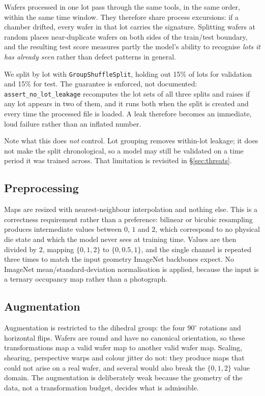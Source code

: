 \documentclass[11pt,a4paper]{article}
\begin{document}
Wafers processed in one lot pass through the same tools, in the same order,
within the same time window. They therefore share process excursions: if a
chamber drifted, every wafer in that lot carries the signature. Splitting
wafers at random places near-duplicate wafers on both sides of the train/test
boundary, and the resulting test score measures partly the model's ability to
recognise \emph{lots it has already seen} rather than defect patterns in
general.

We split by lot with \texttt{GroupShuffleSplit}, holding out 15\% of lots for
validation and 15\% for test. The guarantee is enforced, not documented:
\texttt{assert\_no\_lot\_leakage} recomputes the lot sets of all three splits
and raises if any lot appears in two of them, and it runs both when the split
is created and every time the processed file is loaded. A leak therefore
becomes an immediate, loud failure rather than an inflated number.

Note what this does \emph{not} control. Lot grouping removes within-lot
leakage; it does not make the split chronological, so a model may still be
validated on a time period it was trained across. That limitation is revisited
in \S\ref{sec:threats}.

\subsection{Preprocessing}

Maps are resized with nearest-neighbour interpolation and nothing else. This is
a correctness requirement rather than a preference: bilinear or bicubic
resampling produces intermediate values between $0$, $1$ and $2$, which
correspond to no physical die state and which the model never sees at training
time. Values are then divided by $2$, mapping $\{0,1,2\}$ to
$\{0, 0.5, 1\}$, and the single channel is repeated three times to match the
input geometry ImageNet backbones expect. No ImageNet mean/standard-deviation
normalisation is applied, because the input is a ternary occupancy map rather
than a photograph.

\subsection{Augmentation}

Augmentation is restricted to the dihedral group: the four $90^{\circ}$
rotations and horizontal flips. Wafers are round and have no canonical
orientation, so these transformations map a valid wafer map to another valid
wafer map. Scaling, shearing, perspective warps and colour jitter do not: they
produce maps that could not arise on a real wafer, and several would also break
the $\{0,1,2\}$ value domain. The augmentation is deliberately weak because the
geometry of the data, not a transformation budget, decides what is admissible.
\end{document}
